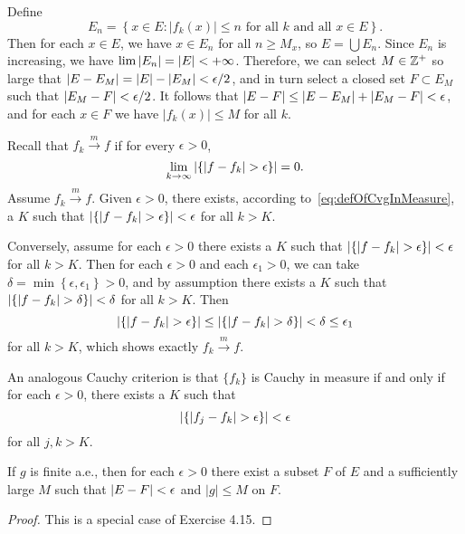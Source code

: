 \begin{exercise}{4.15}
  Define
  \[
    E_n = \left\{ x \in E : \lvert f_k(x) \rvert \le n
    \text{ for all $k$ and all $x \in E$} \right\}.
  \]
  Then for each $x \in E$,
  we have $x \in E_n$ for all $n \ge M_x$,
  so $E = \bigcup E_n$.
  Since $E_n$ is increasing,
  we have $\lim \left\vert E_n\right\vert = \left\vert E\right\vert < +\infty$.
  Therefore, we can select $M \in \mathbb{Z}^+$ so large that
  $\left\vert E - E_M\right\vert = \left\vert E\right\vert - \left\vert E_M\right\vert < \epsilon/2$,
  and in turn select a closed set $F \subset E_M$ such that
  $\left\vert E_M - F\right\vert < \epsilon/2$.
  It follows that $\left\vert E - F\right\vert \le \left\vert E - E_M\right\vert + \left\vert E_M - F\right\vert < \epsilon$,
  and for each $x \in F$ we have
  $\lvert f_k(x) \rvert \le M$ for all $k$.
\end{exercise}

\begin{exercise}{4.16}
  Recall that $f_k \xrightarrow{m} f$ if for every $\epsilon > 0$,
  \begin{equation}
    \lim_{k \rightarrow \infty} \left\vert\left\{ \lvert f - f_k \rvert > \epsilon \right\}\right\vert = 0.
    \label{eq:defOfCvgInMeasure}
  \end{equation}
  Assume $f_k \xrightarrow{m} f$.
  Given $\epsilon > 0$,
  there exists, according to~\eqref{eq:defOfCvgInMeasure}, a $K$ such that
  $\left\vert\left\{ \lvert f - f_k \rvert > \epsilon \right\}\right\vert < \epsilon$
  for all $k > K$.

  Conversely, assume for each $\epsilon > 0$ there exists a $K$ such that
  $\left\vert\left\{ \lvert f - f_k \rvert > \epsilon \right\}\right\vert < \epsilon$
  for all $k > K$.
  Then for each $\epsilon > 0$ and each $\epsilon_1 > 0$,
  we can take $\delta = \min \left\{ \epsilon, \epsilon_1 \right\} > 0$,
  and by assumption there exists a $K$ such that
  $\left\vert\left\{ \lvert f - f_k \rvert > \delta \right\}\right\vert < \delta$
  for all $k > K$.
  Then
  \[
    \left\vert\left\{ \lvert f - f_k \rvert > \epsilon \right\}\right\vert
    \le \left\vert\left\{ \lvert f - f_k \rvert > \delta \right\}\right\vert
    < \delta \le \epsilon_1
  \]
  for all $k > K$, which shows exactly $f_k \xrightarrow{m} f$.

  An analogous Cauchy criterion is that
  $\{f_k\}$ is Cauchy in measure if and only if
  for each $\epsilon > 0$,
  there exists a $K$ such that
  \[
    \left\vert\left\{ \lvert f_j - f_k \rvert > \epsilon \right\}\right\vert < \epsilon
  \]
  for all $j, k > K$.
\end{exercise}

\begin{lemma}
  If $g$ is finite a.e.,
  then for each $\epsilon > 0$
  there exist a subset $F$ of $E$ and a sufficiently large $M$ such that
  $\left\vert E - F\right\vert < \epsilon$ and $\lvert g \rvert \le M$ on $F$.
\end{lemma}
\begin{proof}
  This is a special case of Exercise 4.15.
\end{proof}

